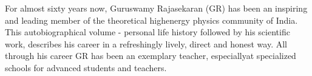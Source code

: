 \thispagestyle{empty}






\begin{figure}[H]
\end{figure}
\medskip

For almost sixty years now, Guruswamy Rajasekaran (GR) has been an inspiring and leading member of the theoretical high\break energy  physics community of India. This autobiographical volume - personal life history followed by his scientific work, describes his career in a refreshingly lively, direct and honest way. All through his career GR has been an exemplary teacher, especially\break at specialized schools for advanced students and teachers.


~\thispagestyle{empty}
